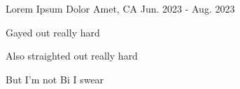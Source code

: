   \cventry
    {Lorem} %
    {Ipsum Dolor} %
    {Amet, CA} %
    {Jun. 2023 - Aug. 2023} %
    {
      \begin{cvitems} %
        \item {
        Gayed out really hard
        }
        \item {
        Also straighted out really hard
        }
        \item {
        But I'm not Bi I swear
        }
      \end{cvitems}
    }
